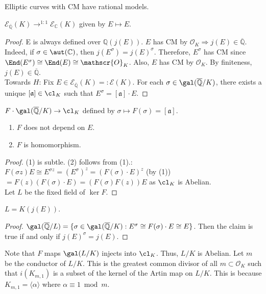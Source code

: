 \indent Elliptic curves with CM have rational models.
\begin{theorem}
$\mathscr{E}_{\overline{\mathbb{Q}}}(K) \to^{1:1} \mathscr{E}_{\mathbb{C}}(K)$ given by $E \mapsto E$.
\end{theorem}
\begin{proof}
E is always defined over $\mathbb{Q}(j(E))$.  $E$ has CM by $\mathscr{O}_{K} \Rightarrow j(E) \in \overline{\mathbb{Q}}$.  Indeed, if $\sigma \in \aut(\mathbb{C})$, then $j(E^{\sigma})=j(E)^{\sigma}$.  Therefore, $E^{\sigma}$ has CM since $\End(E^{\sigma}) \cong \End(E) \cong \mathscr{O}_{K}$.  Also, $E$ has CM by $\mathscr{O}_{K}$.  By finiteness, $j(E) \in \overline{\mathbb{Q}}$.\\
\indent Towards $H$:  Fix $E \in \mathscr{E}_{\overline{\mathbb{Q}}}(K)=:\mathscr{E}(K)$.  For each $\sigma \in \gal(\overline{\mathbb{Q}}/K)$, there exists a unique $[\mathfrak{a}] \in \cl_{K}$ such that $E^{\sigma}=[\mathfrak{a}]\cdot E$.
\end{proof}
\begin{definition}
$F \cdot \gal(\overline{\mathbb{Q}}/K) \to \cl_{K}$ defined by $\sigma \mapsto F(\sigma) = [\mathfrak{a}]$.
\end{definition}
\begin{proposition}
\begin{enumerate}[label=(\arabic{enumi})]
\item $F$ does not depend on $E$.
\item $F$ is homomorphism.
\end{enumerate}
\end{proposition}
\begin{proof}
(1) is subtle. (2) follows from (1).:  $F(\sigma z) E \cong E^{\sigma z}=(E^{\sigma})^{z}=(F(\sigma) \cdot E)^{z}$ (by (1)) $=F(z) (F(\sigma)\cdot E)=(F(\sigma)F(z))E$ as $\cl_{K}$ is Abelian.\\
\indent Let $L$ be the fixed field of $\ker F$.
\end{proof}
\begin{claim}
$L=K(j(E))$.
\end{claim}
\begin{proof}
$\gal(\overline{\mathbb{Q}}/L)=\{\sigma \in \gal(\overline{\mathbb{Q}}/K):E^{\sigma} \cong F(\sigma) \cdot E \cong E\}$.  Then the claim is true if and only if $j(E)^{\sigma}=j(E)$.
\end{proof}
Note that $F$ maps $\gal(L/K)$ injects into $\cl_{K}$.  Thus, $L/K$ is Abelian.  Let $m$ be the conductor of $L/K$.  This is the greatest common divisor of all $m \subset \mathscr{O}_{K}$ such that $i(K_{m,1})$ is a subset of the kernel of the Artin map on $L/K$.  This is because $K_{m,1}=\langle \alpha \rangle$ where $\alpha \equiv 1 \bmod{m}$.\\
